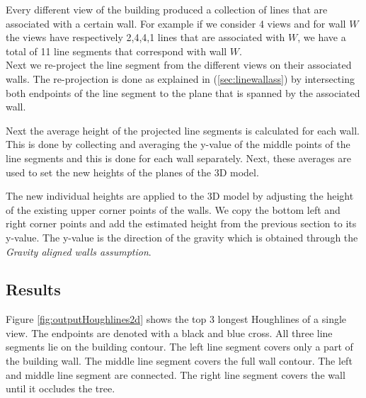 	Every different view of the building produced a collection of lines that are
	associated with a certain wall. For example if we consider 4 views and for
	wall $W$ the views have respectively 2,4,4,1 lines that are associated with
	$W$, we have a total of 11 line segments that correspond with wall $W$.\\

	Next we re-project the line segment from the different views on their
	associated walls.  The re-projection is done as explained in
	(\ref{sec:linewallass}) by intersecting both endpoints
	of the line segment to the plane that is spanned by the associated wall.

	\clearpage

	Next the average height of the projected line segments is calculated for
	each wall. This is done by collecting and averaging the y-value of
	the middle points of the line segments and this is done for each wall separately.
	Next, these averages are
	used to set the new heights of the planes of the 3D model.  

	The new individual heights are applied to the 3D model by adjusting the
	height of the existing upper corner points of the walls. We copy the bottom
	left and right corner points and add the estimated height from the previous
	section to its y-value. The y-value is the direction of the gravity which is
	obtained through the \emph{Gravity aligned walls assumption}.\\

\newpage
\subsection{Results}
\label{sec:ResultImprove}
\clearpage
{}
\clearpage

Figure \ref{fig:outputHoughlines2d} shows the top 3 longest Houghlines of a
single view. The endpoints are denoted with a black and blue cross. All three line segments lie on the
building contour.  The left line segment covers only a part of the building wall. The
middle line segment covers the full wall contour. The left and middle line segment are connected. The
right line segment covers the wall until it occludes the tree.\\

